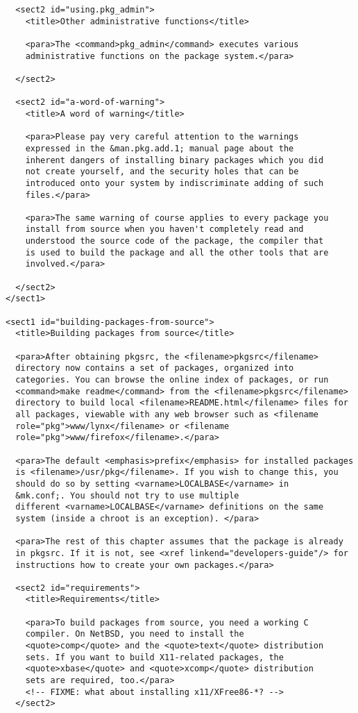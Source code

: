 \begin{verbatim}
  <sect2 id="using.pkg_admin">
    <title>Other administrative functions</title>

    <para>The <command>pkg_admin</command> executes various
    administrative functions on the package system.</para>

  </sect2>

  <sect2 id="a-word-of-warning">
    <title>A word of warning</title>

    <para>Please pay very careful attention to the warnings
    expressed in the &man.pkg.add.1; manual page about the
    inherent dangers of installing binary packages which you did
    not create yourself, and the security holes that can be
    introduced onto your system by indiscriminate adding of such
    files.</para>

    <para>The same warning of course applies to every package you
    install from source when you haven't completely read and
    understood the source code of the package, the compiler that
    is used to build the package and all the other tools that are
    involved.</para>

  </sect2>
</sect1>

<sect1 id="building-packages-from-source">
  <title>Building packages from source</title>

  <para>After obtaining pkgsrc, the <filename>pkgsrc</filename>
  directory now contains a set of packages, organized into
  categories. You can browse the online index of packages, or run
  <command>make readme</command> from the <filename>pkgsrc</filename>
  directory to build local <filename>README.html</filename> files for
  all packages, viewable with any web browser such as <filename
  role="pkg">www/lynx</filename> or <filename
  role="pkg">www/firefox</filename>.</para>

  <para>The default <emphasis>prefix</emphasis> for installed packages
  is <filename>/usr/pkg</filename>. If you wish to change this, you
  should do so by setting <varname>LOCALBASE</varname> in
  &mk.conf;. You should not try to use multiple
  different <varname>LOCALBASE</varname> definitions on the same
  system (inside a chroot is an exception). </para>

  <para>The rest of this chapter assumes that the package is already
  in pkgsrc. If it is not, see <xref linkend="developers-guide"/> for
  instructions how to create your own packages.</para>

  <sect2 id="requirements">
    <title>Requirements</title>

    <para>To build packages from source, you need a working C
    compiler. On NetBSD, you need to install the
    <quote>comp</quote> and the <quote>text</quote> distribution
    sets. If you want to build X11-related packages, the
    <quote>xbase</quote> and <quote>xcomp</quote> distribution
    sets are required, too.</para>
    <!-- FIXME: what about installing x11/XFree86-*? -->
  </sect2>



\end{verbatim}
